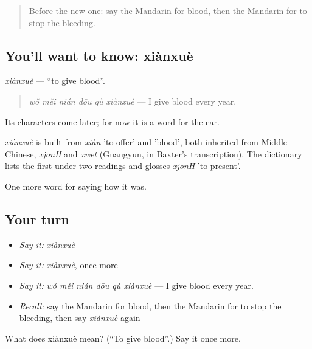 \label{lesson:ZH-C479-xianxue}



\begin{quote}
Before the new one: say the Mandarin for blood, then the Mandarin for to stop the bleeding.
\end{quote}

\subsection*{You'll want to know: xiànxuè}
\emph{xiànxuè} — \textquotedblleft{}to give blood\textquotedblright{}.

\begin{quote}
\emph{wǒ měi nián dōu qù xiànxuè} — I give blood every year.
\end{quote}

Its characters come later; for now it is a word for the ear.

\begin{cousinweb}
\emph{xiànxuè} is built from \emph{xiàn} 'to offer' and  'blood', both inherited from Middle Chinese, \emph{xjonH} and \emph{xwet} (Guangyun, in Baxter's transcription). The dictionary lists the first under two readings and glosses \emph{xjonH} 'to present'.
\end{cousinweb}

\begin{grammarlens}[title={What you've built}]
One more word for saying how it was.
\end{grammarlens}

\subsection*{Your turn}
\begin{itemize}
\raggedright
  \item \emph{Say it:} \emph{xiànxuè}
  \item \emph{Say it:} \emph{xiànxuè}, once more
  \item \emph{Say it:} \emph{wǒ měi nián dōu qù xiànxuè} — I give blood every year.
  \item \emph{Recall:} say the Mandarin for blood, then the Mandarin for to stop the bleeding, then say \emph{xiànxuè} again
\end{itemize}

\begin{tcolorbox}[breakable,colback=teal!4,colframe=teal!35!black,title={Before you move on}]
What does xiànxuè mean? (\textquotedblleft{}To give blood\textquotedblright{}.) Say it once more.
\end{tcolorbox}
